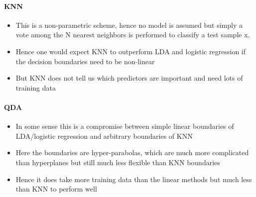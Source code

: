 \documentclass[../document.tex]{subfiles}
\begin{document}
	\paragraph{KNN}
	\begin{itemize}
		\item This is a non-parametric scheme, hence no model is assumed but simply a vote among the N nearest neighbors is performed to classify a test sample x.
		\item Hence one would expect KNN to outperform LDA and logistic regression if the decision boundaries need to be non-linear
		\item But KNN does not tell us which predictors are important and need lots of training data
	\end{itemize}
	\paragraph{QDA}
	\begin{itemize}
		\item In some sense this is a compromise between simple linear boundaries of LDA/logistic regression and arbitrary boundaries of KNN
		\item Here the boundaries are hyper-parabolas, which are much more complicated than hyperplanes but still much less flexible than KNN boundaries
		\item Hence it does take more training data than the linear methods but much less than KNN to perform well
	\end{itemize}
\end{document}
